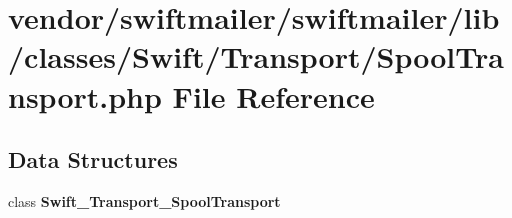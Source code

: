\section{vendor/swiftmailer/swiftmailer/lib/classes/\+Swift/\+Transport/\+Spool\+Transport.php File Reference}
\label{_transport_2_spool_transport_8php}
\subsection*{Data Structures}
\begin{DoxyCompactItemize}
\item 
class {\bf Swift\+\_\+\+Transport\+\_\+\+Spool\+Transport}
\end{DoxyCompactItemize}
